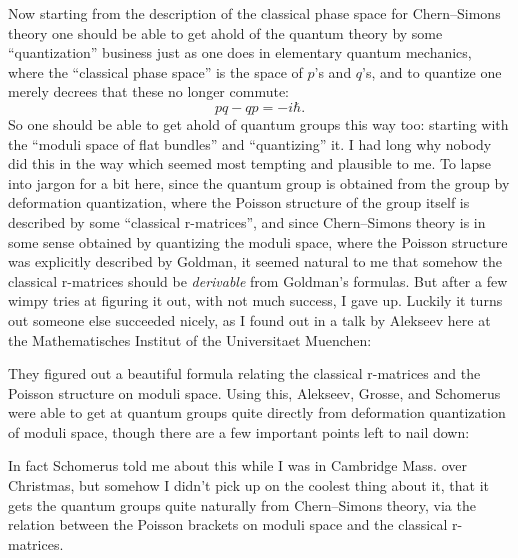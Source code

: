 \documentclass[12pt]{article}
\def\tightlist{}
\renewcommand{\texttt}[1]{%
  \begingroup
  \ttfamily
  \begingroup\lccode`~=`/\lowercase{\endgroup\def~}{/\discretionary{}{}{}}%
  \begingroup\lccode`~=`[\lowercase{\endgroup\def~}{[\discretionary{}{}{}}%
  \begingroup\lccode`~=`.\lowercase{\endgroup\def~}{.\discretionary{}{}{}}%
  \catcode`/=\active\catcode`[=\active\catcode`.=\active
  \scantokens{#1\noexpand}%
  \endgroup
}
\begin{document}
Now starting from the description of the classical phase space for
Chern--Simons theory one should be able to get ahold of the quantum
theory by some ``quantization'' business just as one does in elementary
quantum mechanics, where the ``classical phase space'' is the space of
\(p\)'s and \(q\)'s, and to quantize one merely decrees that these no
longer commute: \[pq-qp = -i \hbar.\] So one should be able to get ahold
of quantum groups this way too: starting with the ``moduli space of flat
bundles'' and ``quantizing'' it. I had long why nobody did this in the
way which seemed most tempting and plausible to me. To lapse into jargon
for a bit here, since the quantum group is obtained from the group by
deformation quantization, where the Poisson structure of the group
itself is described by some ``classical r-matrices'', and since
Chern--Simons theory is in some sense obtained by quantizing the moduli
space, where the Poisson structure was explicitly described by Goldman,
it seemed natural to me that somehow the classical r-matrices should be
\emph{derivable} from Goldman's formulas. But after a few wimpy tries at
figuring it out, with not much success, I gave up. Luckily it turns out
someone else succeeded nicely, as I found out in a talk by Alekseev here
at the Mathematisches Institut of the Universitaet Muenchen:

\noindent
They figured out a beautiful formula relating the classical r-matrices
and the Poisson structure on moduli space. Using this, Alekseev, Grosse,
and Schomerus were able to get at quantum groups quite directly from
deformation quantization of moduli space, though there are a few
important points left to nail down:

\noindent
In fact Schomerus told me about this while I was in Cambridge Mass. over
Christmas, but somehow I didn't pick up on the coolest thing about it,
that it gets the quantum groups quite naturally from Chern--Simons
theory, via the relation between the Poisson brackets on moduli space
and the classical r-matrices.
\end{document}
